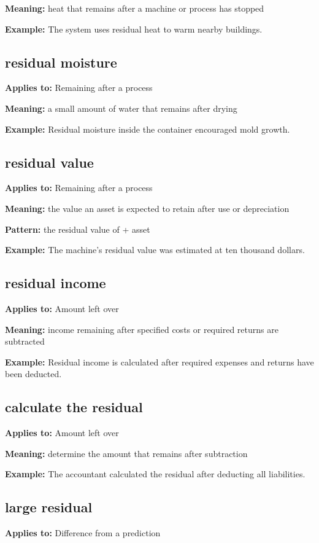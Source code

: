 \documentclass[11pt]{article}
\begin{document}
\textbf{Meaning:} heat that remains after a machine or process has stopped

\textbf{Example:} The system uses residual heat to warm nearby buildings.

\subsection{residual moisture}
\textbf{Applies to:} Remaining after a process

\textbf{Meaning:} a small amount of water that remains after drying

\textbf{Example:} Residual moisture inside the container encouraged mold growth.

\subsection{residual value}
\textbf{Applies to:} Remaining after a process

\textbf{Meaning:} the value an asset is expected to retain after use or depreciation

\textbf{Pattern:} the residual value of + asset

\textbf{Example:} The machine's residual value was estimated at ten thousand dollars.

\subsection{residual income}
\textbf{Applies to:} Amount left over

\textbf{Meaning:} income remaining after specified costs or required returns are subtracted

\textbf{Example:} Residual income is calculated after required expenses and returns have been deducted.

\subsection{calculate the residual}
\textbf{Applies to:} Amount left over

\textbf{Meaning:} determine the amount that remains after subtraction

\textbf{Example:} The accountant calculated the residual after deducting all liabilities.

\subsection{large residual}
\textbf{Applies to:} Difference from a prediction
\end{document}
